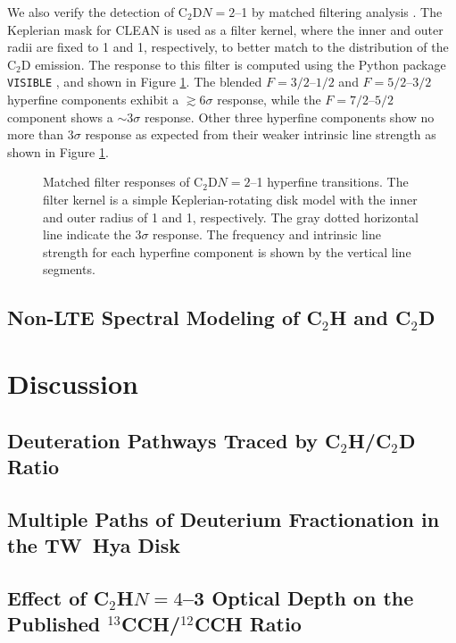 \documentclass[linenumbers, twocolumn, times]{aastex631}
\newcommand{\CCH}{C$_2$H\xspace}
\newcommand{\CCD}{C$_2$D\xspace}
\begin{document}
We also verify the detection of \CCD $N=2$--1 by matched filtering analysis \citep{Loomis2018}. The Keplerian mask for CLEAN is used as a filter kernel, where the inner and outer radii are fixed to 1 and 1, respectively, to better match to the distribution of the \CCD emission. The response to this filter is computed using the Python package \texttt{VISIBLE} \citep{Loomis2018}, and shown in Figure \ref{fig:matched_filter_C2D}. The blended $F=3/2$--$1/2$ and $F=5/2$--$3/2$ hyperfine components exhibit a ${\gtrsim}6\sigma$ response, while the $F=7/2$--$5/2$ component shows a ${\sim}3\sigma$ response. Other three hyperfine components show no more than $3\sigma$ response as expected from their weaker intrinsic line strength as shown in Figure \ref{fig:matched_filter_C2D}. 


\begin{figure}
\caption{Matched filter responses of \CCD $N=2$--1 hyperfine transitions. The filter kernel is a simple Keplerian-rotating disk model with the inner and outer radius of 1 and 1, respectively. The gray dotted horizontal line indicate the $3\sigma$ response. The frequency and intrinsic line strength for each hyperfine component is shown by the vertical line segments.}
\label{fig:matched_filter_C2D}
\end{figure}


\subsection{Non-LTE Spectral Modeling of \CCH and \CCD}

\section{Discussion} \label{sec:discussion}

\subsection{Deuteration Pathways Traced by \CCH/\CCD Ratio}

\subsection{Multiple Paths of Deuterium Fractionation in the TW~Hya Disk}

\subsection{Effect of \CCH $N=4$--3 Optical Depth on the Published $^{13}$CCH/$^{12}$CCH Ratio}
\end{document}
